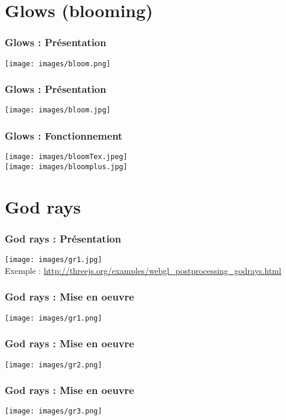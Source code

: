 \documentclass[10pt]{beamer}
\begin{document}
\section{Glows (blooming)}

\begin{frame}
	\frametitle{Glows : Présentation}
    \centering
    \texttt{[image: images/bloom.png]}
\end{frame}

\begin{frame}
	\frametitle{Glows : Présentation}
    \centering
    \texttt{[image: images/bloom.jpg]}
\end{frame}

\begin{frame}
	\frametitle{Glows : Fonctionnement}
    \centering
    \texttt{[image: images/bloomTex.jpeg]}\\
    \vspace{0.5cm}\pause
    \texttt{[image: images/bloomplus.jpg]}
\end{frame}




\section{God rays}

\begin{frame}
	\frametitle{God rays : Présentation}
    \centering
    \texttt{[image: images/gr1.jpg]}\\
    Exemple : \url{http://threejs.org/examples/webgl_postprocessing_godrays.html}
\end{frame}

\begin{frame}
	\frametitle{God rays : Mise en oeuvre}
    \centering
    \texttt{[image: images/gr1.png]}
\end{frame}

\begin{frame}
	\frametitle{God rays : Mise en oeuvre}
    \centering
    \texttt{[image: images/gr2.png]}
\end{frame}

\begin{frame}
	\frametitle{God rays : Mise en oeuvre}
    \centering
    \texttt{[image: images/gr3.png]}
\end{frame}
\end{document}
